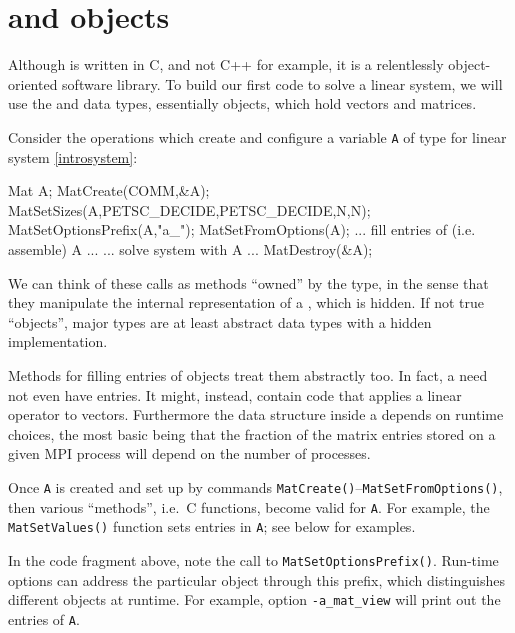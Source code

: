 \section{\PETSc \pVec and \pMat objects}

Although \PETSc is written in C, and not C++ for example, it is a relentlessly object-oriented software library.  To build our first \PETSc code to solve a linear system, we will use the \pVec and \pMat data types, essentially objects, which hold vectors and matrices.

Consider the operations which create and configure a variable \texttt{A} of type \pMat for linear system \eqref{introsystem}:
\begin{code}
Mat A;
MatCreate(COMM,&A);
MatSetSizes(A,PETSC_DECIDE,PETSC_DECIDE,N,N);
MatSetOptionsPrefix(A,"a_");
MatSetFromOptions(A);
... fill entries of (i.e. assemble) A ...
... solve system with A ...
MatDestroy(&A);
\end{code}
We can think of these calls as methods ``owned'' by the \pMat type, in the sense that they manipulate the internal representation of a \pMat, which is hidden.  If not true ``objects'', major \PETSc types are at least abstract data types with a hidden implementation.

Methods for filling entries of \pMat objects treat them abstractly too.  In fact, a \pMat need not even have entries.  It might, instead, contain code that applies a linear operator to vectors.  Furthermore the data structure inside a \pMat depends on runtime choices, the most basic being that the fraction of the matrix entries stored on a given MPI process will depend on the number of processes.

Once \pMat \texttt{A} is created and set up by commands \texttt{MatCreate()}--\texttt{MatSetFromOptions()}, then various ``methods'', i.e.~C functions, become valid for \texttt{A}.  For example, the \texttt{MatSetValues()} function sets entries in \texttt{A}; see below for examples.

In the code fragment above, note the call to \texttt{MatSetOptionsPrefix()}.  Run-time options can address the particular \pMat object through this prefix, which distinguishes different \pMat objects at runtime.  For example, option \texttt{-a\_mat\_view} will print out the entries of \texttt{A}.
 
